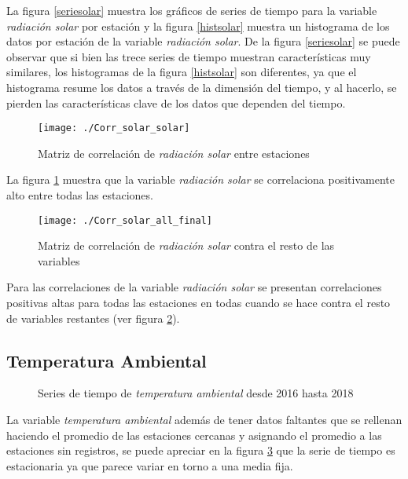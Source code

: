 La figura \ref{seriesolar} muestra los gráficos de series de tiempo para la variable {\em radiación solar} por estación y la figura \ref{histsolar} muestra un histograma de los datos por estación de la variable {\em radiación solar}. De la figura \ref{seriesolar} se puede observar que si bien las trece series de tiempo muestran características muy similares, los histogramas de la figura \ref{histsolar} son diferentes, ya que el histograma resume los datos a través de la dimensión del tiempo, y al hacerlo, se pierden las características clave de los datos que dependen del tiempo.

\begin{figure}[H]
\centering
\texttt{[image: ./Corr\_solar\_solar]}
\caption{Matriz de correlación de {\em radiación solar} entre estaciones }
\label{corrsolar2}
\end{figure}

La figura \ref{corrsolar2} muestra que la variable {\em radiación solar} se correlaciona positivamente alto entre todas las estaciones.

\begin{figure}[H]
\centering
\texttt{[image: ./Corr\_solar\_all\_final]}
\caption{Matriz de correlación de {\em radiación solar} contra el resto de las variables}
\label{corrsolar}
\end{figure}

Para las correlaciones de la variable {\em radiación solar} se presentan correlaciones positivas altas para todas las estaciones en todas cuando se hace contra el resto de variables restantes (ver figura \ref{corrsolar}). 




\subsection{Temperatura Ambiental}
\begin{figure}[H]
\centering
{}
\caption{Series de tiempo de {\em temperatura ambiental} desde 2016 hasta 2018}
\label{serietemperature}
\end{figure}

La variable {\em temperatura ambiental} además de tener datos faltantes que se rellenan haciendo el promedio de las estaciones cercanas y asignando el promedio a las estaciones sin registros, se puede apreciar en la figura \ref{serietemperature} que la serie de tiempo es estacionaria ya que parece variar en torno a una media fija.

